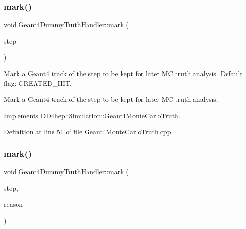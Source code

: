 \subsubsection{\texorpdfstring{mark()}{mark()}\hspace{0.1cm}{\footnotesize\ttfamily [3/4]}}
{\footnotesize\ttfamily void Geant4\+Dummy\+Truth\+Handler\+::mark (\begin{DoxyParamCaption}\item[{const G4\+Step $\ast$}]{step }\end{DoxyParamCaption})\hspace{0.3cm}{\ttfamily [virtual]}}



Mark a Geant4 track of the step to be kept for later MC truth analysis. Default flag\+: C\+R\+E\+A\+T\+E\+D\+\_\+\+H\+IT. 

Mark a Geant4 track of the step to be kept for later MC truth analysis. 

Implements \hyperlink{class_d_d4hep_1_1_simulation_1_1_geant4_monte_carlo_truth_a6aa3674a7c9e2f0132251bf05c7dab88}{D\+D4hep\+::\+Simulation\+::\+Geant4\+Monte\+Carlo\+Truth}.



Definition at line 51 of file Geant4\+Monte\+Carlo\+Truth.\+cpp.

\hypertarget{class_d_d4hep_1_1_simulation_1_1_geant4_dummy_truth_handler_a0387d2cf651a83c45242962f80c41096}{}\label{class_d_d4hep_1_1_simulation_1_1_geant4_dummy_truth_handler_a0387d2cf651a83c45242962f80c41096} 
\subsubsection{\texorpdfstring{mark()}{mark()}\hspace{0.1cm}{\footnotesize\ttfamily [4/4]}}
{\footnotesize\ttfamily void Geant4\+Dummy\+Truth\+Handler\+::mark (\begin{DoxyParamCaption}\item[{const G4\+Step $\ast$}]{step,  }\item[{int}]{reason }\end{DoxyParamCaption})\hspace{0.3cm}{\ttfamily [virtual]}}



